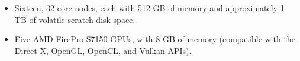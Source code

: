 \documentclass{easychair}
\begin{document}
\begin{itemize}
\item
Sixteen, 32-core nodes, each with 512 GB of memory and approximately 1 TB of  volatile-scratch disk space. 
\item
Five AMD FirePro S7150 GPUs, with 8 GB of memory (compatible with the Direct X, OpenGL, OpenCL, and Vulkan APIs). 
\end{itemize}

%
\nocite{aosa-book-vol1}
\label{sect:bib}

%
%
%


\end{document}
